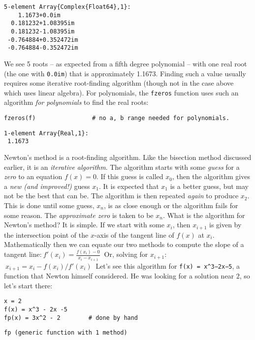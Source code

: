 \documentclass[12pt]{article}
\begin{document}
\begin{verbatim}
5-element Array{Complex{Float64},1}:
    1.1673+0.0im     
  0.181232+1.08395im 
  0.181232-1.08395im 
 -0.764884+0.352472im
 -0.764884-0.352472im\end{verbatim}
\newline
We see 5 roots – as expected from a fifth degree polynomial – with one real root (the one with \texttt{0.0im}) that is approximately 1.1673. Finding such a value usually requires some iterative root-finding algorithm (though not in the case above which uses linear algebra). For polynomials, the \texttt{fzeros} function uses such an algorithm \textit{for polynomials} to find the real roots:\begin{verbatim}
fzeros(f)                # no a, b range needed for polynomials.
\end{verbatim}
\begin{verbatim}
1-element Array{Real,1}:
 1.1673\end{verbatim}
\newline
Newton's method is a root-finding algorithm.  Like the bisection method discussed earlier, it is an \textit{iterative algorithm}. The algorithm starts with some \textit{guess} for a \textit{zero} to an equation $f(x)=0$. If this guess is called $x_0$, then the algorithm gives a \textit{new (and improved!)} guess $x_1$. It is expected that $x_1$ is a better guess, but may not be the best that can be. The algorithm is then repeated \textit{again} to produce $x_2$. This is done until some guess, $x_n$, is as close enough or the algorithm fails for some reason. The \textit{approximate zero} is taken to be $x_n$.\newline
What is the algorithm for Newton's method? It is simple. If we start with some $x_i$, then $x_{i+1}$ is given by the intersection point of the $x$-axis of the tangent line of $f(x)$ at $x_i$. Mathematically then we can equate our two methods to compute the slope of a tangent line:$~
f'(x_i) = \frac{f(x_i) - 0}{x_i - x_{i+1}}
~$\newline
Or, solving for $x_{i+1}$:$~
x_{i+1} = x_i - f(x_i)/f'(x_i)
~$\newline
Let's see this algorithm for \texttt{f(x) = x^3−2x−5}, a function that Newton himself considered. He was looking for a solution near $2$, so let's start there:\begin{verbatim}
x = 2
f(x) = x^3 - 2x -5
fp(x) = 3x^2 - 2		# done by hand
\end{verbatim}
\begin{verbatim}
fp (generic function with 1 method)\end{verbatim}
\end{document}
